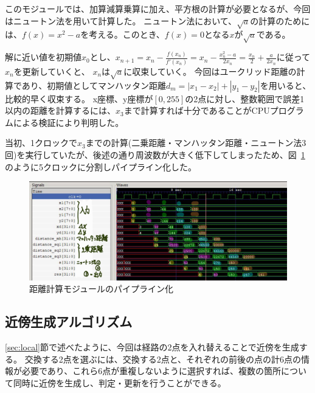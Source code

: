 このモジュールでは、加算減算乗算に加え、平方根の計算が必要となるが、今回はニュートン法を用いて計算した。
ニュートン法において、$\sqrt{a}$の計算のためには、$f(x)=x^2-a$を考える。このとき、$f(x)=0$となる$x$が$\sqrt{a}$である。

解に近い値を初期値$x_0$とし、$x_{n+1}=x_n-\frac{f(x_n)}{f'(x_n)}=x_n-\frac{x_n^2-a}{2x_n}=\frac{x_n}{2}+\frac{a}{2x_n}$に従って$x_n$を更新していくと、
$x_n$は$\sqrt{a}$に収束していく。
今回はユークリッド距離の計算であり、初期値としてマンハッタン距離$d_m=|x_1-x_2|+|y_1-y_2|$を用いると、比較的早く収束する。
x座標、y座標が$[0,255]$の2点に対し、整数範囲で誤差1以内の距離を計算するには、$x_3$まで計算すれば十分であることがCPUプログラムによる検証により判明した。

当初、1クロックで$x_3$までの計算(二乗距離・マンハッタン距離・ニュートン法3回)を実行していたが、後述の通り周波数が大きく低下してしまったため、図~\ref{fig:distance}のように5クロックに分割しパイプライン化した。

\begin{figure}
    \begin{center}
        \includegraphics[width=15cm]{figure/distance_newton.jpg}
        \caption{距離計算モジュールのパイプライン化}\label{fig:distance}
    \end{center}
\end{figure}

\subsection{近傍生成アルゴリズム}
\ref{sec:local}節で述べたように、今回は経路の2点を入れ替えることで近傍を生成する。
交換する2点を選ぶには、交換する2点と、それぞれの前後の点の計6点の情報が必要であり、これら6点が重複しないように選択すれば、複数の箇所について同時に近傍を生成し、判定・更新を行うことができる。

